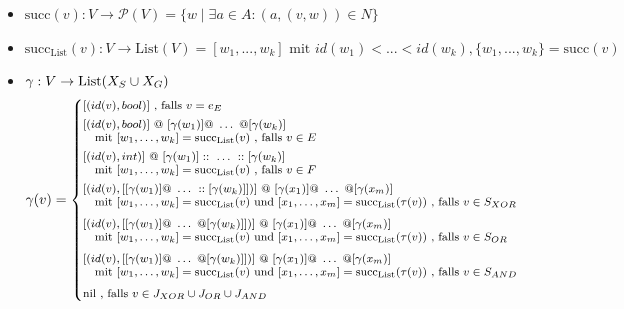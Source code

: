 \begin{itemize}
    \item $\text{succ}(v): V \rightarrow \mathcal{P}(V) = \{w \mid \exists a \in A: (a,(v,w)) \in N\}$ \\
    \item $\text{succ}_{\text{List}}(v): V \rightarrow \text{List}(V) = [w_1, ..., w_k] \text{ mit } id(w_1) < ... < id(w_k), \{w_1, ..., w_k\} = \text{succ}(v)$ \\
    \item {
        $\gamma: V \rightarrow \text{List}(X_S \cup X_G) \\$
        $$\footnotesize
        \gamma(v) = \left\{
        \begin{array}{@{}l@{}}
        [(id(v), bool)] \text{ , falls } v = e_E \\[4pt]
        [(id(v), bool)]\ @\ [\gamma(w_1)] @\ \dots\ @ [\gamma(w_k)] \\
        \quad \text{mit } [w_1,\dots,w_k] = \text{succ}_{\text{List}}(v) \text{ , falls } v \in E \\[4pt]
        [(id(v), int)]\ @\ [\gamma(w_1)] ::\ \dots\ :: [\gamma(w_k)] \\
        \quad \text{mit } [w_1,\dots,w_k] = \text{succ}_{\text{List}}(v) \text{ , falls } v \in F \\[4pt]
        [(id(v), [[\gamma(w_1)] @\ \dots\ :: [\gamma(w_k)]])]\ @\ [\gamma(x_1)] @\ \dots\ @ [\gamma(x_m)] \\
        \quad \text{mit } [w_1,\dots,w_k] = \text{succ}_{\text{List}}(v) \text{ und } [x_1,\dots,x_m] = \text{succ}_{\text{List}}(\tau(v)) \text{ , falls } v \in S_{XOR} \\[6pt]
        [(id(v), [[\gamma(w_1)] @\ \dots\ @ [\gamma(w_k)]])]\ @\ [\gamma(x_1)] @\ \dots\ @ [\gamma(x_m)] \\
        \quad \text{mit } [w_1,\dots,w_k] = \text{succ}_{\text{List}}(v) \text{ und } [x_1,\dots,x_m] = \text{succ}_{\text{List}}(\tau(v)) \text{ , falls } v \in S_{OR} \\[6pt]
        [(id(v), [[\gamma(w_1)] @\ \dots\ @ [\gamma(w_k)]])]\ @\ [\gamma(x_1)] @\ \dots\ @ [\gamma(x_m)] \\
        \quad \text{mit } [w_1,\dots,w_k] = \text{succ}_{\text{List}}(v) \text{ und } [x_1,\dots,x_m] = \text{succ}_{\text{List}}(\tau(v)) \text{ , falls } v \in S_{AND} \\[6pt]
        \text{nil} \text{ , falls } v \in J_{XOR} \cup J_{OR} \cup J_{AND}
        \end{array}
        \right.
        \normalsize$$
    }
\end{itemize}

